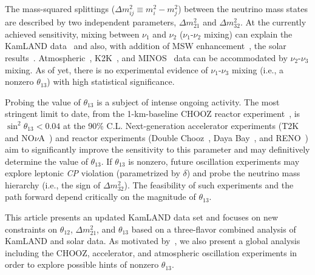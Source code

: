 \documentclass[aps,prc,twocolumn,groupedaddress,showpacs,amsmath,amssymb,floatfix,superscriptaddress]{revtex4}
\begin{document}
The mass-squared splittings ($\Delta m^{2}_{ij} \equiv m^2_i-m^2_j$) between the neutrino mass states are described by two independent parameters, $\Delta m^{2}_{21}$ and $\Delta m^{2}_{32}$. At the currently achieved sensitivity, mixing between $\nu_{1}$ and $\nu_{2}$ ($\nu_{1}$-$\nu_{2}$ mixing) can explain the KamLAND data~\cite{Abe2008} and also, with addition of MSW enhancement~\cite{Wolfenstein1979, Mikheyev1985}, the solar results~\cite{Cleveland1998, Hampel1999, Altmann2005, Abdurashitov2009, Hosaka2006, Aharmim2010, Aharmim2008, Arpesella2008b}.  Atmospheric~\cite{Wendell2010}, K2K~\cite{Ahn2006}, and MINOS~\cite{Adamson2008} data can be accommodated by $\nu_{2}$-$\nu_{3}$ mixing.  As of yet, there is no experimental evidence of $\nu_{1}$-$\nu_{3}$ mixing (i.e., a nonzero $\theta_{13}$) with high statistical significance.

Probing the value of $\theta_{13}$ is a subject of intense ongoing activity. The most stringent limit to date, from the 1-km-baseline CHOOZ reactor experiment~\cite{Apollonio2003}, is $\sin^{2} \theta_{13} < 0.04$ at the 90\% C.L. Next-generation accelerator experiments (T2K~\cite{Itow2001} and NO$\nu$A~\cite{Ayres2005}) and reactor experiments (Double Chooz~\cite{Ardellier2004}, Daya Bay~\cite{Guo2007}, and RENO~\cite{Ahn2010}) aim to significantly improve the sensitivity to this parameter and may definitively determine the value of $\theta_{13}$.  If $\theta_{13}$ is nonzero, future oscillation experiments may explore leptonic {\it CP} violation (parametrized by $\delta$) and probe the neutrino mass hierarchy (i.e., the sign of $\Delta m^{2}_{32}$). The feasibility of such experiments and the path forward depend critically on the magnitude of $\theta_{13}$. 
  
This article presents an updated KamLAND data set and focuses on new constraints on $\theta_{12}$, $\Delta m^{2}_{21}$, and $\theta_{13}$ based on a three-flavor combined analysis of KamLAND and solar data. As motivated by~\cite{Fogli2008}, we also present a global analysis including the CHOOZ, accelerator, and atmospheric oscillation experiments in order to explore possible hints of nonzero $\theta_{13}$.  
\end{document}
